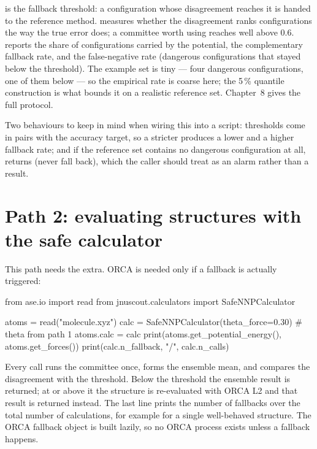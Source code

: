 \begin{readbox}
 is the fallback threshold: a configuration whose disagreement
reaches it is handed to the reference method.   measures
whether the disagreement ranks configurations the way the true error does; a
committee worth using reaches well above 0.6.  
reports the share of configurations carried by the potential, the
complementary fallback rate, and the false-negative rate (dangerous
configurations that stayed below the threshold).  The example set is tiny ---
four dangerous configurations, one of them below  --- so the
empirical rate is coarse here; the 5\,\% quantile construction is what bounds
it on a realistic reference set.  Chapter~8 gives the full protocol.
\end{readbox}

Two behaviours to keep in mind when wiring this into a script: thresholds
come in pairs with the accuracy target, so a stricter 
produces a lower  and a higher fallback rate; and if the
reference set contains no dangerous configuration at all,
 returns  (never fall back), which the
caller should treat as an alarm rather than a result.

\section{Path 2: evaluating structures with the safe calculator}

This path needs the \code{[nnp]} extra.  ORCA is needed only if a fallback
is actually triggered:

\begin{codeblock}
from ase.io import read
from jnuscout.calculators import SafeNNPCalculator

atoms = read("molecule.xyz")
calc = SafeNNPCalculator(theta_force=0.30)        # theta from path 1
atoms.calc = calc
print(atoms.get_potential_energy(), atoms.get_forces())
print(calc.n_fallback, "/", calc.n_calls)
\end{codeblock}

Every call runs the committee once, forms the ensemble mean, and compares the
disagreement with the threshold.  Below the threshold the ensemble result is
returned; at or above it the structure is re-evaluated with ORCA L2 and that
result is returned instead.  The last line prints the number of fallbacks
over the total number of calculations, for example  for a single
well-behaved structure.  The ORCA fallback object is built lazily, so no ORCA
process exists unless a fallback happens.

